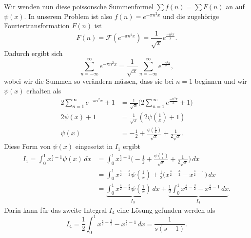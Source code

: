 Wir wenden nun diese poissonsche Summenformel $\sum f(n) = \sum F(n)$ an auf $\psi(x)$.
In unserem Problem ist also $f(n) =  e^{-\pi n^2 x}$ und die zugehörige Fouriertransformation $F(n)$ ist
\begin{equation}
    F(n)
    =
    \mathcal{F}
    (
    e^{-\pi n^2 x}
    )
    =
    \frac{1}{\sqrt{x}}
    e^{\frac{-n^2 \pi}{x}}.
\end{equation}
Dadurch ergibt sich
\begin{equation}\label{zeta:equation:psi}
    \sum_{n=-\infty}^{\infty}
    e^{-\pi n^2 x}
    =
    \frac{1}{\sqrt{x}}
    \sum_{n=-\infty}^{\infty}
    e^{\frac{-n^2 \pi}{x}},
\end{equation}
wobei wir die Summen so verändern müssen, dass sie bei $n=1$ beginnen und wir $\psi(x)$ erhalten als
\begin{align}
    2
    \sum_{n=1}^{\infty}
    e^{-\pi n^2 x}
    +
    1
    &=
    \frac{1}{\sqrt{x}}
    \Biggl(
    2
    \sum_{n=1}^{\infty}
    e^{\frac{-n^2 \pi}{x}}
    +
    1
    \Biggr)
    \\
    2
    \psi(x)
    +
    1
    &=
    \frac{1}{\sqrt{x}}
    \left(
    2
    \psi\left(\frac{1}{x}\right)
    +
    1
    \right)
    \\
    \psi(x)
    &=
    - \frac{1}{2}
    + \frac{\psi\left(\frac{1}{x} \right)}{\sqrt{x}}
    + \frac{1}{2 \sqrt{x}}.\label{zeta:equation:psi}
\end{align}
Diese Form von $\psi(x)$ eingesetzt in $I_1$ ergibt
\begin{align}
    I_1
    =
    \int_0^{1}
    x^{\frac{s}{2}-1}
    \psi(x)
    \,dx
    &=
    \int_0^{1}
    x^{\frac{s}{2}-1}
    \Biggl(
    - \frac{1}{2}
    + \frac{\psi\left(\frac{1}{x} \right)}{\sqrt{x}}
    + \frac{1}{2 \sqrt{x}}
    \Biggr)
    \,dx
    \\
    &=
    \int_0^{1}
    x^{\frac{s}{2}-\frac{3}{2}}
    \psi \left( \frac{1}{x} \right)
    + \frac{1}{2}
    \biggl(
    x^{\frac{s}{2}-\frac{3}{2}}
    -
    x^{\frac{s}{2}-1}
    \biggl)
    \,dx
    \\
    &=
    \underbrace{
    \int_0^{1}
    x^{\frac{s}{2}-\frac{3}{2}}
    \psi \left( \frac{1}{x} \right)
    \,dx
    }_{\displaystyle{I_3}}
    +
    \underbrace{
    \frac{1}{2}
    \int_0^1
    x^{\frac{s}{2}-\frac{3}{2}}
    -
    x^{\frac{s}{2}-1}
    \,dx
    }_{\displaystyle{I_4}}. \label{zeta:equation:integral3}
\end{align}
Darin kann für das zweite Integral $I_4$ eine Lösung gefunden werden als
\begin{equation}
    I_4
    =
    \frac{1}{2}
    \int_0^1
    x^{\frac{s}{2}-\frac{3}{2}}
    -
    x^{\frac{s}{2}-1}
    \,dx
    =
    \frac{1}{s(s-1)}.
\end{equation}

